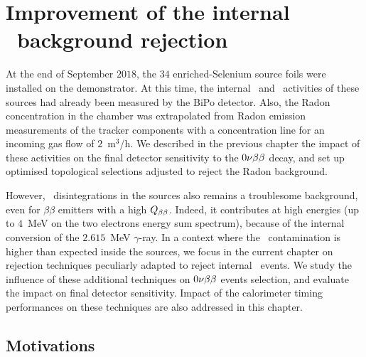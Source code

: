 \chapter{Improvement of the internal \Tl\ background rejection}
\label{ch:timediff}

At the end of September $2018$, the $34$ enriched-Selenium source foils were installed on the demonstrator.
At this time, the internal \Tl\ and \Bi\ activities of these sources had already been measured by the BiPo detector.
Also, the Radon concentration in the chamber was extrapolated from Radon emission measurements of the tracker components with a concentration line for an incoming gas flow of $2$~m$^{3}$/h.
We described in the previous chapter the impact of these activities on the final detector sensitivity to the $0\nu\beta\beta$ decay, and set up optimised topological selections adjusted to reject the Radon background.

However, \Tl\ disintegrations in the sources also remains a troublesome background, even for $\beta\beta$ emitters with a high $Q_{\beta\beta}$.
Indeed, it contributes at high energies (up to $4$~MeV on the two electrons energy sum spectrum), because of the internal conversion of the $2.615$~MeV $\gamma$-ray.
In a context where the \Tl\ contamination is higher than expected inside the sources, we focus in the current chapter on rejection techniques peculiarly adapted to reject internal \Tl\ events.
We study the influence of these additional techniques on $0\nu\beta\beta$ events selection, and evaluate the impact on final detector sensitivity.
Impact of the calorimeter timing performances on these techniques are also addressed in this chapter.

\section{Motivations}

